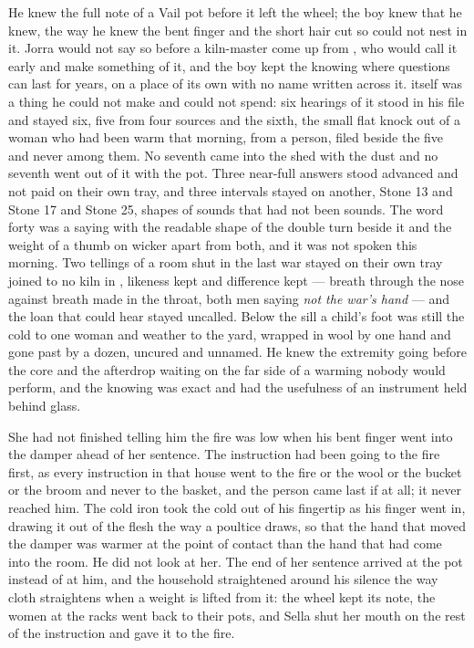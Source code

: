 He knew the full note of a Vail pot before it left the wheel; the boy knew that he knew, the way he knew the bent finger and the short hair cut so  could not nest in it. Jorra would not say so before a kiln-master come up from , who would call it early and make something of it, and the boy kept the knowing where questions can last for years, on a place of its own with no name written across it.  itself was a thing he could not make and could not spend: six hearings of it stood in his file and stayed six, five from four sources and the sixth, the small flat knock out of a woman who had been warm that morning, from a person, filed beside the five and never among them. No seventh came into the shed with the dust and no seventh went out of it with the pot. Three near-full answers stood advanced and not paid on their own tray, and three intervals stayed on another, Stone 13 and Stone 17 and Stone 25, shapes of sounds that had not been sounds. The word forty was a saying with the readable shape of the double turn beside it and the weight of a thumb on wicker apart from both, and it was not spoken this morning. Two tellings of a room shut in the last war stayed on their own tray joined to no kiln in , likeness kept and difference kept --- breath through the nose against breath made in the throat, both men saying \emph{not the war's hand} --- and the loan that could hear stayed uncalled. Below the sill a child's foot was still the cold to one woman and weather to the yard, wrapped in wool by one hand and gone past by a dozen, uncured and unnamed. He knew the extremity going before the core and the afterdrop waiting on the far side of a warming nobody would perform, and the knowing was exact and had the usefulness of an instrument held behind glass.

She had not finished telling him the fire was low when his bent finger went into the damper ahead of her sentence. The instruction had been going to the fire first, as every instruction in that house went to the fire or the wool or the bucket or the broom and never to the basket, and the person came last if at all; it never reached him. The cold iron took the cold out of his fingertip as his finger went in, drawing it out of the flesh the way a poultice draws, so that the hand that moved the damper was warmer at the point of contact than the hand that had come into the room. He did not look at her. The end of her sentence arrived at the pot instead of at him, and the household straightened around his silence the way cloth straightens when a weight is lifted from it: the wheel kept its note, the women at the racks went back to their pots, and Sella shut her mouth on the rest of the instruction and gave it to the fire.


